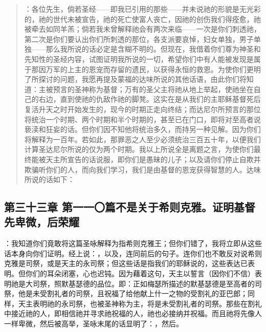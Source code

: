 \begin{quotation}
：各位先生，倘若圣经——即我已引用的那些——并未说祂的形貌是无光彩的，祂的世代未被宣告，祂的死亡使富人丧亡，因祂的创伤我们得痊愈，祂被牵去如同羊羔；倘若我未曾解释祂会有两次来临——一次是你们刺透祂，第二次是你们要认出你们所刺透的那位，各支派要哀悼，妇女单独，男子单独——那么我所说的话必定是含糊不明的。但现在，我借着你们尊为神圣和先知性的圣经内容，试图证明我所说的一切，希望你们中有人能被发现是属于那因万军的上主的恩宠而存留的遗民，以获得永恒的救恩。为使你们更明了所探讨的问题，我愿再提及蒙福的达味所说的其他话语，由此你们将知道：主被预言的圣神称为基督；万有的圣父主将祂从地上举起，使祂坐在自己的右边，直到使祂的仇敌作祂的脚凳。这实在是从我们的主耶稣基督死后复活升天之时开始发生的，现今的时期正走向终结；而达尼尔所预言的那位将统治一个时期、两个时期和半个时期的，甚至已在门口，即将对至高者说亵渎和狂妄的话。但你们因不知他将统治多久，而持另一种见解。因为你们将解释为一百年。若如此，那罪恶之人至少必须统治三百五十年，以便我们计算圣达尼尔所说的仅为两个时期。我以上所说全是离题之言，为使你们最终能被天主所宣告的话说服，即你们是愚昧的儿子；以及请你们停止自欺并欺骗听你们的人，而向我们学习，我们是由基督的恩宠获得智慧的人。达味所说的话如下：
\end{quotation}

\par


\subsection{第三十三章 第一一〇篇不是关于希则克雅。证明基督先卑微，后荣耀}

：我知道你们竟敢将这篇圣咏解释为指希则克雅王；但你们错了，我将立即从这些话本身向你们证明。经上说：，以及，连同前后的句子。连你们也不敢反对说希则克雅是司祭，或是天主的永司祭；但这些话是指我们的耶稣说的，这些表达已表明。但你们的耳朵闭塞，心也迟钝。因为藉着这句，天主以誓言（因你们不信）表明祂是大司祭，照默基瑟德的品位。即：正如梅瑟所描述的默基瑟德是至高者的司祭，他是未受割礼者的司祭，且祝福了给他献上什一之物的受割礼的亚巴郎；同样，天主表明祂的永司祭，也被圣神称为主，将是未受割礼者的司祭。那些在割礼中接近祂的人，即相信祂并寻求祂祝福的人，祂也必接纳并祝福。而且祂将先像人一样卑微，然后被高举，圣咏末尾的话显明了：，然后。\par

